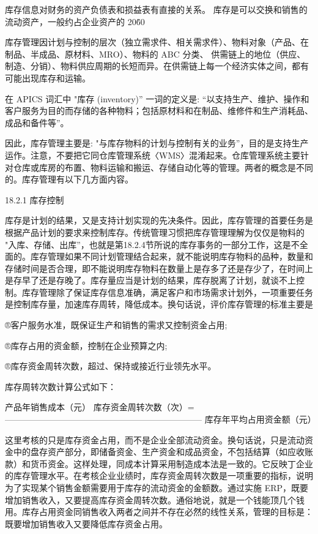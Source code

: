     库存信息对财务的资产负债表和损益表有直接的关系。 库存是可以交换和销售的流动资产，一般约占企业资产的 20\~60%

    库存管理因计划与控制的层次（独立需求件、相关需求件）、物料对象（产品、在制品、半成品、原材料、MRO）、物料的 ABC 分类、 供需链上的地位（供应、制造、分销）、物料供应周期的长短而异。在供需链上每一个经济实体之间，都有可能出现库存和运输。

    在 APICS 词汇中 "库存 (inventory)” 一词的定义是: “以支持生产、维护、操作和客户服务为目的而存储的各种物料；包括原材料和在制品、维修件和生产消耗品、成品和备件等”。

    因此，库存管理主要是: "与库存物料的计划与控制有关的业务”，目的是支持生产运作。注意，不要把它同仓库管理系统〈WMS〉混淆起来。仓库管理系统主要针对仓库或库房的布置、物料运输和搬运、存储自动化等的管理。两者的概念是不同的。库存管理有以下几方面内容。

18.2.1 库存控制

    库存是计划的结果，又是支持计划实现的先决条件。因此，库存管理的首要任务是根据产品计划的要求来控制库存。传统管理习惯把库存管理理解为仅仅是物料的 "入库、存储、出库”，也就是第18.2.4节所说的库存事务的一部分工作，这是不全面的。库存管理如果不同计划管理结合起来，就不能说明库存物料的品种，数量和存储时间是否合理，即不能说明库存物料在数量上是存多了还是存少了，在时间上是存早了还是存晚了。库存量应当是计划的结果，库存脱离了计划，就谈不上控制。库存管理除了保证库存信息准确，满足客户和市场需求计划外，一项重要任务是控制库存量，加速库存周转，降低成本。换句话说，评价库存管理的标准主要是

    ®客户服务水准，既保证生产和销售的需求又控制资金占用;

    ®库存占用的资金额，控制在企业预算之内;

    ®库存资金周转次数，超过、保持或接近行业领先水平。

    库存周转次数计算公式如下：

                          产品年销售成本（元）
    库存资金周转次数（次）= ———————————————————————
                          库存年平均占用资金额（元）

    这里考核的只是库存资金占用，而不是企业全部流动资金。换句话说，只是流动资金中的盘存资产部分，即储备资金、生产资金和成品资金，不包括结算（如应收账款）和货币资金。这样处理，同成本计算采用制造成本法是一致的。它反映丁企业的库存管理水平。在考核企业业绩时，库存资金周转次数是一项重要的指标，说明为了实现某个销售金额需要用于库存的流动资金的金额数。通过实施 ERP，既要增加销售收入，又要提高库存资金周转次数。通俗地说，就是一个钱能顶几个钱用。库存占用资金同销售收入两者之间并不存在必然的线性关系，管理的目标是：既要增加销售收入又要降低库存资金占用。

